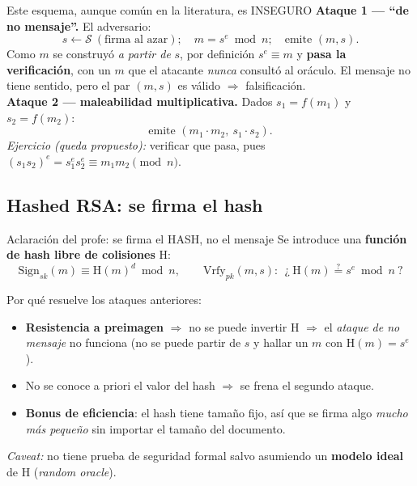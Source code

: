 \documentclass[11pt,a4paper]{article}
\newcommand{\Sset}{\mathcal{S}}
\newcommand{\Sign}{\mathrm{Sign}}
\newcommand{\Vrfy}{\mathrm{Vrfy}}
\newcommand{\Hf}{\mathrm{H}}
\begin{document}
\begin{warnbox}{Este esquema, aunque común en la literatura, es INSEGURO}
\textbf{Ataque 1 — ``de no mensaje''.} El adversario:
\[
  s\leftarrow\Sset\ (\text{firma al azar});\quad m=s^{e}\bmod n;\quad \text{emite }(m,s).
\]
Como $m$ se construyó \emph{a partir de} $s$, por definición $s^e\equiv m$ y
\textbf{pasa la verificación}, con un $m$ que el atacante \emph{nunca} consultó al oráculo. El
mensaje no tiene sentido, pero el par $(m,s)$ es válido $\Rightarrow$ falsificación.\\[4pt]
\textbf{Ataque 2 — maleabilidad multiplicativa.} Dados $s_1=f(m_1)$ y $s_2=f(m_2)$:
\[
  \text{emite } (m_1\cdot m_2,\ s_1\cdot s_2).
\]
\emph{Ejercicio (queda propuesto):} verificar que pasa, pues
$(s_1 s_2)^e = s_1^e s_2^e \equiv m_1 m_2 \pmod n$.
\end{warnbox}

\subsection{Hashed RSA: se firma el hash}
\begin{defbox}{Aclaración del profe: se firma el HASH, no el mensaje}
Se introduce una \textbf{función de hash libre de colisiones} $\Hf$:
\[
  \Sign_{sk}(m) \equiv \Hf(m)^{d}\bmod n, \qquad
  \Vrfy_{pk}(m,s):\ \ \text{¿}\ \Hf(m) \stackrel{?}{=} s^{e}\bmod n\ \text{?}
\]
\end{defbox}
Por qué resuelve los ataques anteriores:
\begin{itemize}[leftmargin=1.4em,itemsep=1pt]
  \item \textbf{Resistencia a preimagen} $\Rightarrow$ no se puede invertir $\Hf$
        $\Rightarrow$ el \emph{ataque de no mensaje} no funciona (no se puede partir de $s$ y
        hallar un $m$ con $\Hf(m)=s^e$).
  \item No se conoce a priori el valor del hash $\Rightarrow$ se frena el segundo ataque.
  \item \textbf{Bonus de eficiencia}: el hash tiene tamaño fijo, así que se firma algo
        \emph{mucho más pequeño} sin importar el tamaño del documento.
\end{itemize}
\emph{Caveat:} no tiene prueba de seguridad formal salvo asumiendo un \textbf{modelo ideal} de
$\Hf$ (\emph{random oracle}).
\end{document}
